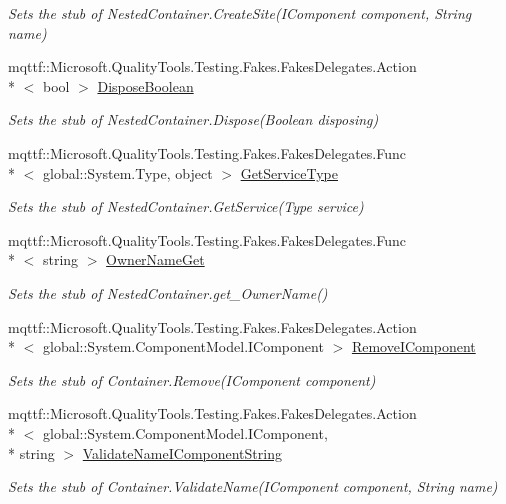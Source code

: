 \begin{DoxyCompactItemize}
\begin{DoxyCompactList}\small\item\em Sets the stub of Nested\-Container.\-Create\-Site(\-I\-Component component, String name)\end{DoxyCompactList}\item 
mqttf\-::\-Microsoft.\-Quality\-Tools.\-Testing.\-Fakes.\-Fakes\-Delegates.\-Action\\*
$<$ bool $>$ \hyperlink{class_system_1_1_component_model_1_1_fakes_1_1_stub_nested_container_ab48f6070f9993a0c3cf19a0519f9795e}{Dispose\-Boolean}
\begin{DoxyCompactList}\small\item\em Sets the stub of Nested\-Container.\-Dispose(\-Boolean disposing)\end{DoxyCompactList}\item 
mqttf\-::\-Microsoft.\-Quality\-Tools.\-Testing.\-Fakes.\-Fakes\-Delegates.\-Func\\*
$<$ global\-::\-System.\-Type, object $>$ \hyperlink{class_system_1_1_component_model_1_1_fakes_1_1_stub_nested_container_aa47a15c759da362f40e7da80086198dd}{Get\-Service\-Type}
\begin{DoxyCompactList}\small\item\em Sets the stub of Nested\-Container.\-Get\-Service(\-Type service)\end{DoxyCompactList}\item 
mqttf\-::\-Microsoft.\-Quality\-Tools.\-Testing.\-Fakes.\-Fakes\-Delegates.\-Func\\*
$<$ string $>$ \hyperlink{class_system_1_1_component_model_1_1_fakes_1_1_stub_nested_container_ac6651c73c63512b06d3c5d5df3119a0a}{Owner\-Name\-Get}
\begin{DoxyCompactList}\small\item\em Sets the stub of Nested\-Container.\-get\-\_\-\-Owner\-Name()\end{DoxyCompactList}\item 
mqttf\-::\-Microsoft.\-Quality\-Tools.\-Testing.\-Fakes.\-Fakes\-Delegates.\-Action\\*
$<$ global\-::\-System.\-Component\-Model.\-I\-Component $>$ \hyperlink{class_system_1_1_component_model_1_1_fakes_1_1_stub_nested_container_a817eb8dbfe5089766d2286f4fa69d30c}{Remove\-I\-Component}
\begin{DoxyCompactList}\small\item\em Sets the stub of Container.\-Remove(\-I\-Component component)\end{DoxyCompactList}\item 
mqttf\-::\-Microsoft.\-Quality\-Tools.\-Testing.\-Fakes.\-Fakes\-Delegates.\-Action\\*
$<$ global\-::\-System.\-Component\-Model.\-I\-Component, \\*
string $>$ \hyperlink{class_system_1_1_component_model_1_1_fakes_1_1_stub_nested_container_a400fb74ebeab3082da8c98a7155e3693}{Validate\-Name\-I\-Component\-String}
\begin{DoxyCompactList}\small\item\em Sets the stub of Container.\-Validate\-Name(\-I\-Component component, String name)\end{DoxyCompactList}\end{DoxyCompactItemize}
